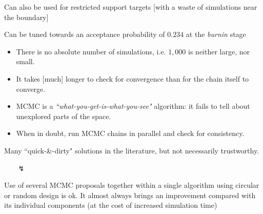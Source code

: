 \begin{slide}
\vs\pause 
Can also be used for restricted support targets [with a waste of simulations near the boundary]

\vs\pause
Can be tuned towards an acceptance probability of $0.234$ at the {\em burnin} stage 

\end{slide}\begin{slide}[label=Convass]

\hfill\hyperlink{MCMC.0}{}

\pause
\begin{itemize}
\item {} There is no absolute number of simulations, i.e.
$1,000$ is neither large, nor small.
\item {} It takes [much] longer to check for convergence 
than for the chain itself to converge.
\item {} MCMC is a {\em ``what-you-get-is-what-you-see"} algorithm: it 
fails to tell about unexplored parts of the space.
\item {} When in doubt, run MCMC chains in parallel and check for 
consistency.
\end{itemize}
\vs\pause
Many ``quick-\&-dirty" solutions in the literature, but not necessarily trustworthy.

\end{slide}\begin{slide}

\begin{itemize}
\item[$\lightning$] 
\end{itemize}

\vs\pause
Use of several MCMC proposals together within a single
algorithm using circular or random design is ok.
It almost always brings an improvement compared with its individual components (at the cost
of increased simulation time)

\end{slide}
